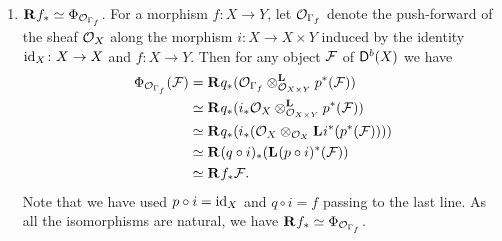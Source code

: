\begin{example}
\begin{enumerate}[label = (\roman*)]
{    }
    \item{$\rderived{}{f_*} \iso \fm{\struct{\Gamma_f}}$. For a morphism $f \colon X \to Y$, let $\struct{\Gamma_f}$ denote the push-forward of the sheaf $\struct{X}$ along the morphism $i\colon X \to X \times Y$ induced by the identity $\id{X}\colon X \to X$ and $f\colon X \to Y$.  Then for any object $\F$ of $\derb{X}$ we have
    \begin{align*}
        \fm{\struct{\Gamma_f}}(\F) &= \rderived{}{q_*}(\derivedtensor{\struct{\Gamma_f}}{p^*(\F)}{\struct{X \times Y}}) \\
        &\iso \rderived{}{q_*}(\derivedtensor{i_*\struct{X}}{{p^*}(\F)}{\struct{X \times Y}}) \\
        &\iso \rderived{}{q_*}(i_*(\struct{X} \otimes_{\struct{X}}\lderived{}{i^*}({p^*}(\F)))) \\
        &\iso \rderived{}{(q \circ i)_*}(\lderived{}{(p \circ i)^*}(\F)) \\
        &\iso \rderived{}{f_*}\F.
    \end{align*}
    Note that we have used $p \circ i = \id{X}$ and $q \circ i = f$ passing to the last line. As all the isomorphisms are natural, we have $\rderived{}{f_*} \iso \fm{\struct{\Gamma_f}}$.
    }
\end{enumerate}
\end{example}

